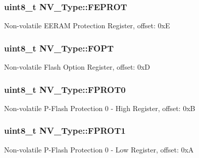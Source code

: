 \subsubsection[{\texorpdfstring{F\+E\+P\+R\+OT}{FEPROT}}]{ uint8\+\_\+t N\+V\+\_\+\+Type\+::\+F\+E\+P\+R\+OT}\hypertarget{structNV__Type_aa28a9317d3ffe8a1501ad7c0b5a938bd}{}\label{structNV__Type_aa28a9317d3ffe8a1501ad7c0b5a938bd}
Non-\/volatile E\+E\+R\+AM Protection Register, offset\+: 0xE 
\subsubsection[{\texorpdfstring{F\+O\+PT}{FOPT}}]{ uint8\+\_\+t N\+V\+\_\+\+Type\+::\+F\+O\+PT}\hypertarget{structNV__Type_aaabff2875971400e0975d365fd8bdd30}{}\label{structNV__Type_aaabff2875971400e0975d365fd8bdd30}
Non-\/volatile Flash Option Register, offset\+: 0xD 
\subsubsection[{\texorpdfstring{F\+P\+R\+O\+T0}{FPROT0}}]{ uint8\+\_\+t N\+V\+\_\+\+Type\+::\+F\+P\+R\+O\+T0}\hypertarget{structNV__Type_a0a1513e86bf3647e0179fc0f547a9b1e}{}\label{structNV__Type_a0a1513e86bf3647e0179fc0f547a9b1e}
Non-\/volatile P-\/\+Flash Protection 0 -\/ High Register, offset\+: 0xB 
\subsubsection[{\texorpdfstring{F\+P\+R\+O\+T1}{FPROT1}}]{ uint8\+\_\+t N\+V\+\_\+\+Type\+::\+F\+P\+R\+O\+T1}\hypertarget{structNV__Type_a4e85ed3eff018d579013a9e26e987f35}{}\label{structNV__Type_a4e85ed3eff018d579013a9e26e987f35}
Non-\/volatile P-\/\+Flash Protection 0 -\/ Low Register, offset\+: 0xA 
